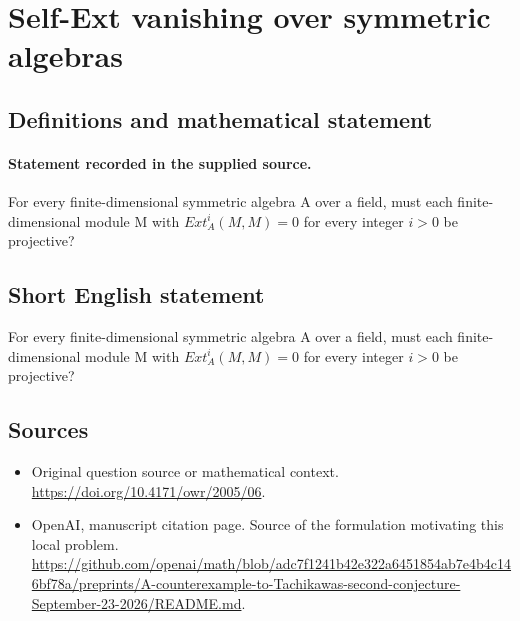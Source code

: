 \documentclass[11pt]{article}
\begin{document}
\section*{Self-Ext vanishing over symmetric algebras}\label{30007006}
\subsection{Definitions and mathematical statement}
\paragraph{Statement recorded in the supplied source.}
For every finite-dimensional symmetric algebra A over a field, must each finite-dimensional module M with $Ext_A^i(M,M)=0$ for every integer $i>0$ be projective?
\subsection{Short English statement}
For every finite-dimensional symmetric algebra A over a field, must each finite-dimensional module M with $Ext_A^i(M,M)=0$ for every integer $i>0$ be projective?
\subsection{Sources}
\begin{itemize}
\item[S1] Original question source or mathematical context.
\url{https://doi.org/10.4171/owr/2005/06}.
\item[S2] OpenAI, manuscript citation page. Source of the formulation motivating this local problem.
\url{https://github.com/openai/math/blob/adc7f1241b42e322a6451854ab7e4b4c146bf78a/preprints/A-counterexample-to-Tachikawas-second-conjecture-September-23-2026/README.md}.
\end{itemize}
\end{document}
